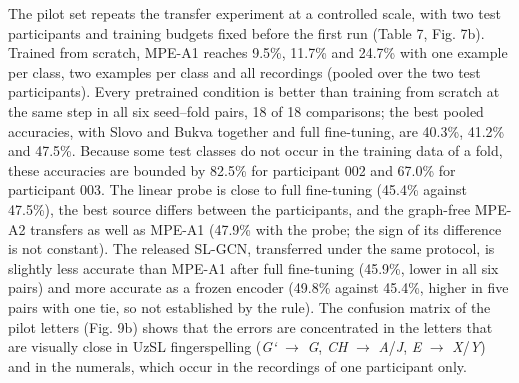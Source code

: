 \documentclass[a4paper,fleqn]{cas-dc}
\begin{document}
The pilot set repeats the transfer experiment at a controlled scale, with two test participants and training budgets fixed before the first run (Table 7, Fig. 7b). Trained from scratch, MPE-A1 reaches 9.5\%, 11.7\% and 24.7\% with one example per class, two examples per class and all recordings (pooled over the two test participants). Every pretrained condition is better than training from scratch at the same step in all six seed--fold pairs, 18 of 18 comparisons; the best pooled accuracies, with Slovo and Bukva together and full fine-tuning, are 40.3\%, 41.2\% and 47.5\%. Because some test classes do not occur in the training data of a fold, these accuracies are bounded by 82.5\% for participant 002 and 67.0\% for participant 003. The linear probe is close to full fine-tuning (45.4\% against 47.5\%), the best source differs between the participants, and the graph-free MPE-A2 transfers as well as MPE-A1 (47.9\% with the probe; the sign of its difference is not constant). The released SL-GCN, transferred under the same protocol, is slightly less accurate than MPE-A1 after full fine-tuning (45.9\%, lower in all six pairs) and more accurate as a frozen encoder (49.8\% against 45.4\%, higher in five pairs with one tie, so not established by the rule). The confusion matrix of the pilot letters (Fig. 9b) shows that the errors are concentrated in the letters that are visually close in UzSL fingerspelling (\emph{G‘} $\rightarrow$ \emph{G}, \emph{CH} $\rightarrow$ \emph{A}/\emph{J}, \emph{E} $\rightarrow$ \emph{X}/\emph{Y}) and in the numerals, which occur in the recordings of one participant only.
\end{document}
